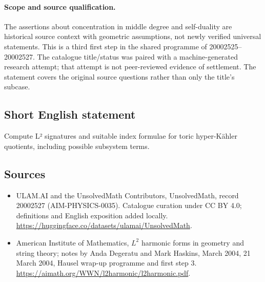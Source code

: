 \documentclass[11pt]{article}
\begin{document}
\paragraph{Scope and source qualification.}The assertions about concentration in middle degree and self-duality are historical source context with geometric assumptions, not newly verified universal statements. This is a third first step in the shared programme of 20002525–20002527. The catalogue title/status was paired with a machine-generated research attempt; that attempt is not peer-reviewed evidence of settlement. The statement covers the original source questions rather than only the title’s subcase.
\subsection{Short English statement}
Compute L² signatures and suitable index formulae for toric hyper-Kähler quotients, including possible subsystem terms.
\subsection{Sources}
\begin{itemize}
\item[\hypertarget{source:20002527:1}{S1}] ULAM.AI and the UnsolvedMath Contributors, UnsolvedMath, record 20002527 (AIM-PHYSICS-0035). Catalogue curation under CC BY 4.0; definitions and English exposition added locally.
\url{https://huggingface.co/datasets/ulamai/UnsolvedMath}.
\item[\hypertarget{source:20002527:2}{S2}] American Institute of Mathematics, $L^2$ harmonic forms in geometry and string theory; notes by Anda Degeratu and Mark Haskins, March 2004, 21 March 2004, Hausel wrap-up programme and first step 3.
\url{https://aimath.org/WWN/l2harmonic/l2harmonic.pdf}.
\end{itemize}
\label{end:20002527}
\end{document}
